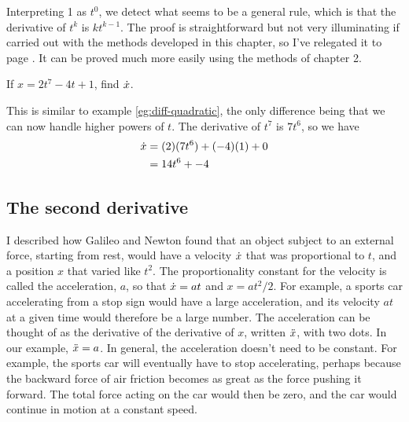 Interpreting 1 as $t^0$, we detect what seems to be a general
rule, which is that the derivative of $t^k$ is $kt^{k-1}$. The proof is straightforward
but not very illuminating if carried out with the methods developed in this chapter,
so I've relegated it to page \pageref{detour:polynomial-proof}. It can be proved
much more easily using the methods of chapter 2.

\begin{eg}
\egquestion If $x=2t^7-4t+1$, find $\dot{x}$.

\eganswer This is similar to example \ref{eg:diff-quadratic}, the only difference being
that we can now handle higher powers of $t$. The derivative of $t^7$ is $7t^6$, so
we have
\begin{align*}
  \dot{x} &= (2)(7t^6)+(-4)(1)+0 \\
        &= 14t^6+-4
\end{align*}
\end{eg}

\subsection{The second derivative}

I described how Galileo and Newton found that an object subject to
an external force, starting from rest, would have a velocity $\dot{x}$ that was
proportional to $t$, and a position $x$ that varied like $t^2$. The proportionality
constant for the velocity is called the acceleration, $a$, so that
$\dot{x}=at$ and $x=at^2/2$. For example, a sports car accelerating from
a stop sign would have a large acceleration, and its velocity $at$ at a given
time would therefore be a large number. The acceleration can be thought of
as the derivative of the derivative of $x$, written $\Ddot{x}$, with two
dots. In our example, $\Ddot{x}=a$. In general, the acceleration doesn't need
to be constant. For example, the sports car will eventually have to stop
accelerating, perhaps because the backward force of air friction becomes as
great as the force pushing it forward. The total force acting on the car would
then be zero, and the car would continue in motion at a constant speed.


